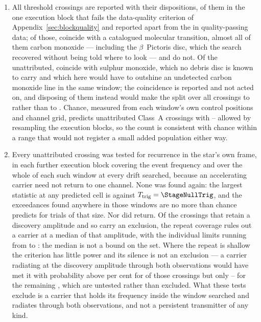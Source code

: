 \begin{enumerate}[leftmargin=1.6em,itemsep=4pt,topsep=4pt,parsep=0pt]
\item All \EvNCrossRaw{} threshold crossings are reported with their
dispositions, \PrFlagXrossWord{} of them in the one execution block
that fails the data-quality criterion of
Appendix~\ref{sec:blockquality} and reported apart from the
\EvNCrossQp{} in quality-passing data; of those, \EvNAttrQp{} coincide with
a catalogued molecular transition, almost all of them carbon monoxide ---
including the $\beta$~Pictoris disc, which the search recovered without
being told where to look --- and \EvNUnattrQp{} do not. Of the unattributed,
\MkNSODecideWord{} coincide with sulphur monoxide, which no debris disc is known to
carry and which here would have to outshine an undetected carbon monoxide
line in the same window; the coincidence is reported and not acted on, and
disposing of them instead would make the split over all \EvNCrossRaw{}
crossings \MkAttrAlt{} to \MkUnattrAlt{} rather than \MkAttr{} to
\MkUnattr. Chance, measured from each window's own control
positions and channel grid, predicts \CeExp{} unattributed Class~A
crossings with \CeLo--\CeHi{} allowed by resampling the execution blocks,
so the count is consistent with chance within a range that would not
register a small added population either way.

\item Every unattributed crossing was tested for recurrence in the star's
own frame, in each further execution block covering the event frequency and
over the whole of each such window at every drift searched, because an
accelerating carrier need not return to one channel. None was found
again: the largest statistic at any predicted cell is \RcTMax{}
against $T_{\rm trig}=\StageNullTrig$, and the exceedances found anywhere in
those windows are no more than chance predicts for trials of that size. Nor
did \PrRankClause{} return. Of the \RcNExcl{} crossings that retain a
discovery amplitude and so carry an exclusion, the repeat coverage rules out
a carrier at a median \RcFracMed{} of that amplitude, with the individual
limits running from \RcFracMin{} to \RcFracMax: the median is not a bound on
the set. Where the repeat is shallow the criterion has little power and its
silence is not an exclusion --- a carrier radiating at the discovery
amplitude through both observations would have met it with probability above
\RcPowerLevel{} per cent for \RcNPowerHi{} of those crossings but only
\RcPowerMin--\RcPowerLoHi{} for the remaining \RcNPowerLo, which are
untested rather than excluded. What these tests exclude is a carrier that
holds its frequency inside the window searched and radiates through both
observations, and not a persistent transmitter of any kind.


\end{enumerate}
